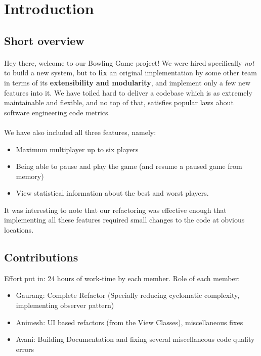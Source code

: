 \section{Introduction}

\subsection{Short overview}

\paragraph{} Hey there, welcome to our Bowling Game project! We were hired specifically \textit{not} to build a new system, but to \textbf{fix} an original implementation by some other team in terms of its \textbf{extensibility and modularity}, and implement only a few new features into it. We have toiled hard to deliver a codebase which is as extremely maintainable and flexible, and no top of that, satisfies popular laws about software engineering code metrics.
\paragraph{} We have also included all three features, namely:
\begin{itemize}
    \item Maximum multiplayer up to six players
    \item Being able to pause and play the game (and resume a paused game from memory)
    \item View statistical information about the best and worst players.
\end{itemize}
It was interesting to note that our refactoring was effective enough that implementing all these features required small changes to the code at obvious locations.

\subsection{Contributions}

Effort put in: 24 hours of work-time by each member. Role of each member:
\begin{itemize}
    \item Gaurang: Complete Refactor (Specially reducing cyclomatic complexity, implementing observer pattern)
    \item Animesh: UI based refactors (from the View Classes), miscellaneous fixes
    \item Avani: Building Documentation and fixing several miscellaneous code quality errors
\end{itemize}

